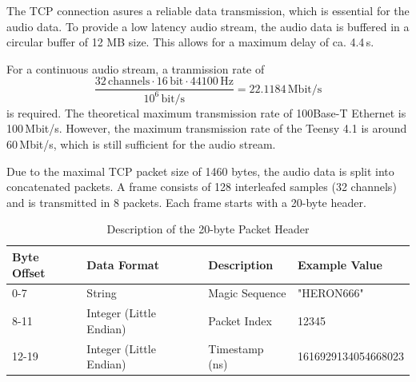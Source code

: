 The TCP connection asures a reliable data transmission, which is essential for the audio data.
To provide a low latency audio stream, the audio data is buffered in a circular buffer of 12 MB size.
This allows for a maximum delay of ca. 4.4\,s.

For a continuous audio stream, a tranmission rate of
\begin{equation}
	\frac{32\,\text{channels} \cdot 16\,\text{bit} \cdot 44100\,\text{Hz}}{10^6\,\text{bit/s}} = 22.1184\,\text{Mbit/s}
\end{equation}
is required.
The theoretical maximum transmission rate of 100Base-T Ethernet is 100\,Mbit/s.
However, the maximum transmission rate of the Teensy 4.1 is around 60\,Mbit/s, which is still sufficient for the audio stream.

Due to the maximal TCP packet size of 1460 bytes, the audio data is split into concatenated packets.
A frame consists of 128 interleafed samples (32 channels) and is transmitted in 8 packets.
Each frame starts with a 20-byte header.

\begin{table}[h]
	\centering
	\begin{tabular}{|l|l|l|l|}
		\hline
		\textbf{Byte Offset} & \textbf{Data Format}    & \textbf{Description} & \textbf{Example Value} \\ \hline
		0-7                  & String                  & Magic Sequence       & "HERON666"             \\ \hline
		8-11                 & Integer (Little Endian) & Packet Index         & 12345                  \\ \hline
		12-19                & Integer (Little Endian) & Timestamp (ns)       & 1616929134054668023    \\ \hline
	\end{tabular}
	\caption{Description of the 20-byte Packet Header}
	\label{tab:packet_header}
\end{table}

